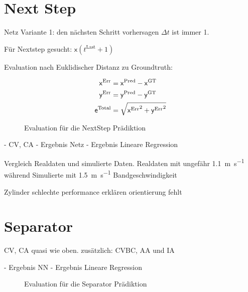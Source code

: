 
\section{Next Step}

Netz Variante 1: den nächsten Schritt vorhersagen
\(\Delta t \) ist immer 1.


Für Nextstep gesucht: \( \mathsf{x}(t^{\text{Last}} + 1)\)



Evaluation nach Euklidischer Distanz zu Groundtruth:

\begin{align*}
    \mathsf{x}{^{\text{Err}}} &=  \mathsf{x}{^{\text{Pred}}} -  \mathsf{x}{^{\text{GT}}} \\
    \mathsf{y}{^{\text{Err}}} &=  \mathsf{y}{^{\text{Pred}}} -  \mathsf{y}{^{\text{GT}}} \\
    \mathsf{e}{^{\text{Total}}} &= \sqrt{ \mathsf{x}{^{\text{Err}}}^2 +  \mathsf{y}{^{\text{Err}}}^2}
\end{align*}


\begin{figure}[h]
    \centering
	\caption{Evaluation für die NextStep Prädiktion}
	\label{fig:boxplotErrorNNnextStep}
\end{figure}

- CV, CA
- Ergebnis Netz
- Ergebnis Lineare Regression


Vergleich Realdaten und simulierte Daten.
Realdaten mit ungefähr \SI{1.1}{\meter\per\second} während Simulierte mit \SI{1.5}{\metre\per\second} Bandgeschwindigkeit 

Zylinder schlechte performance erklären \textrightarrow orientierung fehlt

\section{Separator}

CV, CA quasi wie oben.
zusätzlich: CVBC, AA und IA

- Ergebnis NN
- Ergebnis Lineare Regression

\begin{figure}[h]
    \centering
	\caption{Evaluation für die Separator Prädiktion}
	\label{fig:boxplotErrorNNSeparator}
\end{figure}